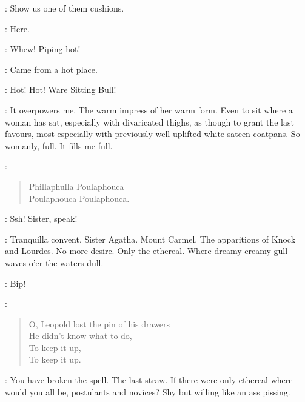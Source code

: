 \VoiceKitty:
Show us one of them cushions.

\VoiceFlorry:
Here.


\VoiceLynch:
Whew!
Piping hot!

\VoiceZoe:
Came from a hot place.

\VoiceVirag:
%
Hot! Hot!
Ware Sitting Bull!

\Bloom:
It overpowers me.
The warm impress of her warm form.
Even to sit where a woman has sat, especially with divaricated thighs,
as though to grant the last favours,
most especially with previously well uplifted white sateen coatpans.
So womanly, full.
It fills me full.

\Waterfall:
\begin{verse}
    Phillaphulla Poulaphouca\\
%
    Poulaphouca Poulaphouca.
\end{verse}

\Yews:
Ssh!
Sister, speak!

\Nymph:
Tranquilla convent.
Sister Agatha.
Mount Carmel.
The apparitions of Knock and Lourdes.
No more desire.
Only the ethereal.
Where dreamy creamy gull waves o'er the waters dull.


\Button:
Bip!


\Sluts:
\begin{verse}
    O, Leopold lost the pin of his drawers\\
    He didn't know what to do,\\
    To keep it up,\\
    To keep it up.
\end{verse}


\Bloom:
You have broken the spell.
The last straw.
If there were only ethereal where would you all be, postulants and novices?
Shy but willing like an ass pissing.

